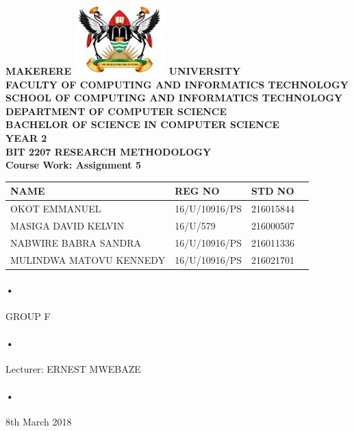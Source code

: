 \documentclass[12pt]{report}
\begin{document}
\begin{Huge}
\begin{center}
\begin{normalsize}
\textbf{MAKERERE \includegraphics[scale=0.5]{logo} UNIVERSITY }\\


\textbf{FACULTY OF COMPUTING AND INFORMATICS TECHNOLOGY} \\
\textbf{SCHOOL OF COMPUTING AND INFORMATICS TECHNOLOGY} \\
\textbf{DEPARTMENT OF COMPUTER SCIENCE} \\
\textbf{BACHELOR OF SCIENCE IN COMPUTER SCIENCE} \\
\textbf{YEAR 2} \\
\textbf{BIT 2207 RESEARCH METHODOLOGY} \\
\textbf{Course Work: Assignment 5}\\
\end{normalsize}
\end{center}
\end{Huge}

\begin{center}
\begin{tabular}{|l|l|l|c|}
\hline NAME  & REG NO & STD NO \\\hline
OKOT EMMANUEL& 16/U/10916/PS & 216015844 \\\hline
MASIGA DAVID KELVIN& 16/U/579 & 216000507 \\\hline
NABWIRE BABRA SANDRA& 16/U/10916/PS & 216011336 \\\hline
MULINDWA MATOVU KENNEDY& 16/U/10916/PS & 216021701 \\\hline
\end{tabular}
\paragraph{•}
GROUP F\\
\paragraph{•}
Lecturer: ERNEST MWEBAZE \\
\paragraph{•}
8th March 2018

\end{center}
\end{document}

